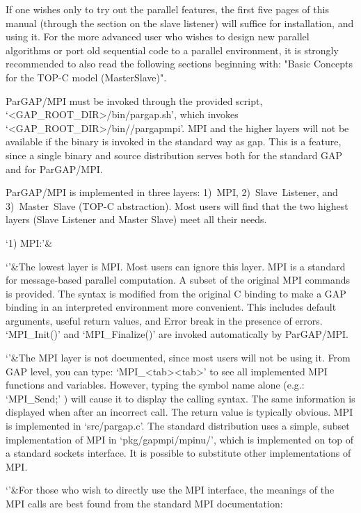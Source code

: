 If one wishes only to try out the parallel features, the first five
pages of this manual (through the section on the slave listener) will
suffice for installation, and using it.  For the more advanced user
who wishes to design new parallel algorithms or port old sequential
code to a parallel environment, it is strongly recommended to also
read the following sections beginning with: "Basic Concepts for
the TOP-C model (MasterSlave)".

ParGAP/MPI must be invoked through the provided script,
`<GAP_ROOT_DIR>/bin/pargap.sh', which invokes
`<GAP_ROOT_DIR>/bin/\*/pargapmpi'.  MPI and
the higher layers will not be available if the binary is invoked in the
standard way as gap.  This is a feature, since a single binary and source
distribution serves both for the standard GAP and for ParGAP/MPI.

ParGAP/MPI is implemented in three layers: 1)~MPI, 2)~Slave~Listener, and
3)~Master~Slave (TOP-C abstraction).  Most users will find that the two
highest layers (Slave Listener and Master Slave) meet all their needs.

\beginitems
`1) MPI:'&

`'&The lowest layer is MPI.  Most users can ignore this layer.  MPI is
   a standard for message-based parallel computation.  A subset of the
   original MPI commands is provided.  The syntax is modified from the
   original C binding to make a GAP binding in an interpreted
   environment more convenient.  This includes default arguments,
   useful return values, and Error break in the presence of errors.
   `MPI_Init()' and `MPI_Finalize()' are invoked
   automatically by ParGAP/MPI.

`'&The MPI layer is not documented, since most users will not be
   using it.  From GAP level, you can type: `MPI_<tab><tab>' to see all
   implemented MPI functions and variables.  However, typing the
   symbol name alone (e.g.: `MPI_Send;' ) will cause it to display the
   calling syntax.  The same information is displayed when after an
   incorrect call.  The return value is typically obvious.  MPI is
   implemented in `src/pargap.c'.  The standard distribution uses a
   simple, subset implementation of MPI in `pkg/gapmpi/mpinu/', which is
   implemented on top of a standard sockets interface.  It is possible
   to substitute other implementations of MPI.


`'&For those who wish to directly use the MPI interface, the meanings
   of the MPI calls are best found from the standard MPI
   documentation:

